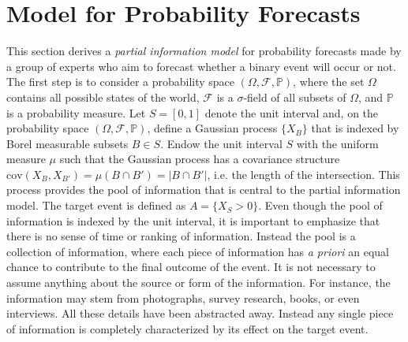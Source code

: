 \documentclass[11pt]{article}
\renewcommand{\P}{\mathbb{P}}
\theoremstyle{definition}
\theoremstyle{definition}
\begin{document}
\section{Model for Probability Forecasts}
\label{Model}
This section derives a \textit{partial information model} for probability forecasts made by a group of experts who aim to forecast whether a binary event will occur or not. The first step is to consider a probability space  $(\Omega, \mathcal{F}, \P)$, where the set $\Omega$ contains all possible states of the world,  $\mathcal{F}$ is a $\sigma$-field of all subsets of $\Omega$, and $\P$ is a probability measure. Let $S = [0,1]$ denote the unit interval and, on the probability space $(\Omega, \mathcal{F}, \P)$, define a Gaussian process $\{ X_B \}$ that is indexed by Borel measurable subsets $B \in S$. Endow the unit interval $S$ with the uniform measure $\mu$ such that the Gaussian process has a covariance structure $\text{cov}(X_B, X_{B'}) = \mu(B \cap B') = |B \cap B'|$, i.e. the length of the intersection. This process provides the pool of information that is central to the partial information model. The target event is defined as $A = \{ X_{S} > 0\}$. Even though the pool of information is indexed by the unit interval, it is important to emphasize that there is no sense of time or ranking of information. Instead the pool is a collection of information, where each piece of information has \textit{a priori} an equal chance to contribute to the final outcome of the event. It is not necessary to assume anything about the source or form of the information. For instance, the information may stem from photographs, survey research, books, or even interviews. All these details have been abstracted away. Instead any single piece of information is completely characterized by its effect on the target event. 
\end{document}
